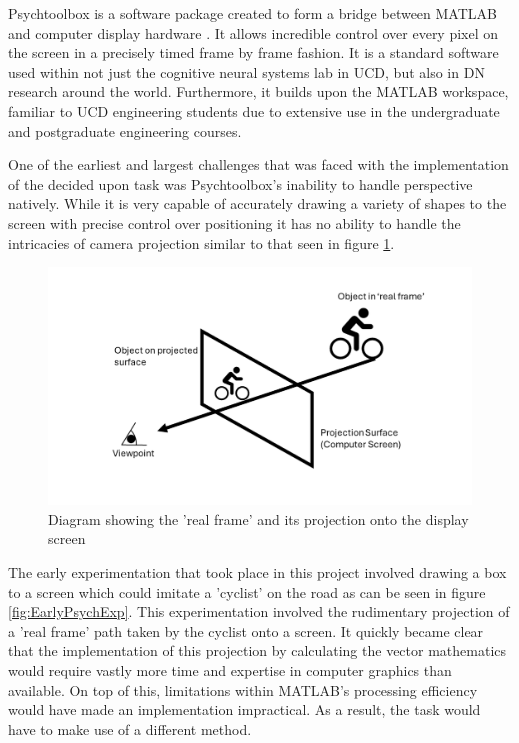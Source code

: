 Psychtoolbox is a software package created to form a bridge between MATLAB and computer display hardware \citep{kleinerWhatNewPsychtoolbox32007}. It allows incredible control over every pixel on the screen in a precisely timed frame by frame fashion. It is a standard software used within not just the cognitive neural systems lab in UCD, but also in DN research around the world. Furthermore, it builds upon the MATLAB workspace, familiar to UCD engineering students due to extensive use in the undergraduate and postgraduate engineering courses.

One of the earliest and largest challenges that was faced with the implementation of the decided upon task was Psychtoolbox's inability to handle perspective natively. While it is very capable of accurately drawing a variety of shapes to the screen with precise control over positioning it has no ability to handle the intricacies of camera projection similar to that seen in figure \ref{fig:MET_Projection}.

\begin{figure}[H]
    \centering
    \includegraphics[width=0.75\linewidth]{figures/Projection Diagram.png}
    \caption{Diagram showing the 'real frame' and its projection onto the display screen}
    \label{fig:MET_Projection}
\end{figure}

The early experimentation that took place in this project involved drawing a box to a screen which could imitate a 'cyclist' on the road as can be seen in figure \ref{fig:EarlyPsychExp}. This experimentation involved the rudimentary projection of a 'real frame' path taken by the cyclist onto a screen. It quickly became clear that the implementation of this projection by calculating the vector mathematics would require vastly more time and expertise in computer graphics than available. On top of this, limitations within MATLAB's processing efficiency would have made an implementation impractical. As a result, the task would have to make use of a different method.

